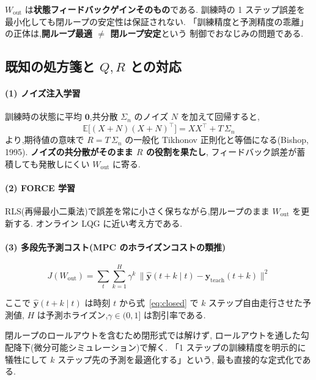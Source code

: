 \documentclass[a4paper,11pt]{ltjsarticle}
\newcommand{\Wout}{W_{\mathrm{out}}}
\newcommand{\yt}{\bm{y}_{\mathrm{teach}}}
\newcommand{\T}{^{\top}}
\begin{document}
\begin{keybox}[title=要点]
$\Wout$ は\textbf{状態フィードバックゲインそのもの}である.
訓練時の 1 ステップ誤差を最小化しても閉ループの安定性は保証されない.
「訓練精度と予測精度の乖離」の正体は,\textbf{開ループ最適 $\neq$ 閉ループ安定}という
制御でおなじみの問題である.
\end{keybox}

\subsection{既知の処方箋と $Q, R$ との対応}

\paragraph{(1) ノイズ注入学習}
訓練時の状態に平均 $\bm{0}$,共分散 $\Sigma_n$ のノイズ $N$ を加えて回帰すると,
\begin{equation}
  \mathbb{E}\bigl[(X+N)(X+N)\T\bigr] = X X\T + T\,\Sigma_n
\end{equation}
より,期待値の意味で $R = T\,\Sigma_n$ の一般化 Tikhonov 正則化と等価になる(Bishop, 1995).
\textbf{ノイズの共分散がそのまま $R$ の役割を果たし},
フィードバック誤差が蓄積しても発散しにくい $\Wout$ に寄る.

\paragraph{(2) FORCE 学習}
RLS(再帰最小二乗法)で誤差を常に小さく保ちながら,閉ループのまま $\Wout$ を更新する.
オンライン LQG に近い考え方である.

\paragraph{(3) 多段先予測コスト(MPC のホライズンコストの類推)}
\begin{keybox}[title=多段先予測コスト]
\begin{equation}
  J(\Wout) = \sum_{t}\sum_{k=1}^{H} \gamma^{k}\,
    \bigl\|\hat{\bm{y}}(t+k \mid t) - \yt(t+k)\bigr\|^2
\end{equation}
\end{keybox}
ここで $\hat{\bm{y}}(t+k\mid t)$ は時刻 $t$ から式~\eqref{eq:closed} で $k$ ステップ自由走行させた予測値,
$H$ は予測ホライズン,$\gamma \in (0,1]$ は割引率である.

閉ループのロールアウトを含むため閉形式では解けず,
ロールアウトを通した勾配降下(微分可能シミュレーション)で解く.
「1 ステップの訓練精度を明示的に犠牲にして $k$ ステップ先の予測を最適化する」という,
最も直接的な定式化である.
\end{document}

